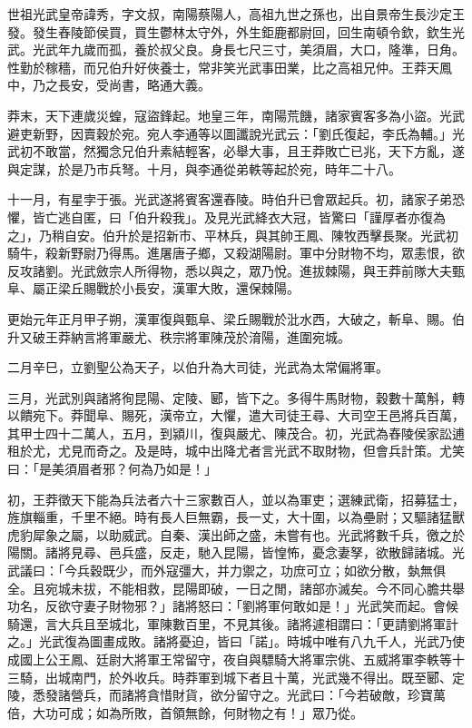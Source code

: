 
\begin{pinyinscope}
世祖光武皇帝諱秀，字文叔，南陽蔡陽人，高祖九世之孫也，出自景帝生長沙定王發。發生舂陵節侯買，買生鬱林太守外，外生鉅鹿都尉回，回生南頓令欽，欽生光武。光武年九歲而孤，養於叔父良。身長七尺三寸，美須眉，大口，隆準，日角。性勤於稼穡，而兄伯升好俠養士，常非笑光武事田業，比之高祖兄仲。王莽天鳳中，乃之長安，受尚書，略通大義。

莽末，天下連歲災蝗，寇盜鋒起。地皇三年，南陽荒饑，諸家賓客多為小盜。光武避吏新野，因賣穀於宛。宛人李通等以圖讖說光武云：「劉氏復起，李氏為輔。」光武初不敢當，然獨念兄伯升素結輕客，必舉大事，且王莽敗亡已兆，天下方亂，遂與定謀，於是乃市兵弩。十月，與李通從弟軼等起於宛，時年二十八。

十一月，有星孛于張。光武遂將賓客還舂陵。時伯升已會眾起兵。初，諸家子弟恐懼，皆亡逃自匿，曰「伯升殺我」。及見光武絳衣大冠，皆驚曰「謹厚者亦復為之」，乃稍自安。伯升於是招新市、平林兵，與其帥王鳳、陳牧西擊長聚。光武初騎牛，殺新野尉乃得馬。進屠唐子鄉，又殺湖陽尉。軍中分財物不均，眾恚恨，欲反攻諸劉。光武斂宗人所得物，悉以與之，眾乃悅。進拔棘陽，與王莽前隊大夫甄阜、屬正梁丘賜戰於小長安，漢軍大敗，還保棘陽。

更始元年正月甲子朔，漢軍復與甄阜、梁丘賜戰於沘水西，大破之，斬阜、賜。伯升又破王莽納言將軍嚴尤、秩宗將軍陳茂於淯陽，進圍宛城。

二月辛巳，立劉聖公為天子，以伯升為大司徒，光武為太常偏將軍。

三月，光武別與諸將徇昆陽、定陵、郾，皆下之。多得牛馬財物，穀數十萬斛，轉以饋宛下。莽聞阜、賜死，漢帝立，大懼，遣大司徒王尋、大司空王邑將兵百萬，其甲士四十二萬人，五月，到潁川，復與嚴尤、陳茂合。初，光武為舂陵侯家訟逋租於尤，尤見而奇之。及是時，城中出降尤者言光武不取財物，但會兵計策。尤笑曰：「是美須眉者邪？何為乃如是！」

初，王莽徵天下能為兵法者六十三家數百人，並以為軍吏；選練武衛，招募猛士，旌旗輜重，千里不絕。時有長人巨無霸，長一丈，大十圍，以為壘尉；又驅諸猛獸虎豹犀象之屬，以助威武。自秦、漢出師之盛，未嘗有也。光武將數千兵，徼之於陽關。諸將見尋、邑兵盛，反走，馳入昆陽，皆惶怖，憂念妻孥，欲散歸諸城。光武議曰：「今兵穀既少，而外寇彊大，并力禦之，功庶可立；如欲分散，埶無俱全。且宛城未拔，不能相救，昆陽即破，一日之閒，諸部亦滅矣。今不同心膽共舉功名，反欲守妻子財物邪？」諸將怒曰：「劉將軍何敢如是！」光武笑而起。會候騎還，言大兵且至城北，軍陳數百里，不見其後。諸將遽相謂曰：「更請劉將軍計之。」光武復為圖畫成敗。諸將憂迫，皆曰「諾」。時城中唯有八九千人，光武乃使成國上公王鳳、廷尉大將軍王常留守，夜自與驃騎大將軍宗佻、五威將軍李軼等十三騎，出城南門，於外收兵。時莽軍到城下者且十萬，光武幾不得出。既至郾、定陵，悉發諸營兵，而諸將貪惜財貨，欲分留守之。光武曰：「今若破敵，珍寶萬倍，大功可成；如為所敗，首領無餘，何財物之有！」眾乃從。


\end{pinyinscope}
